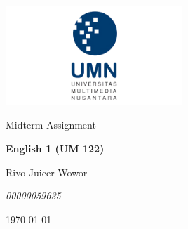 \documentclass[
  12pt,
  answers  
]{exam}
\newcommand{\mytitle}{English 1 (UM 122)}
\newcommand{\theauthor}{Rivo Juicer Wowor}
\newcommand{\affiliation}{00000059635}
\begin{document}
	\begin{titlepage}
		\centering
		\vspace{2cm}
		\includegraphics[width=0.5\textwidth]{../../ref/logoUMN.png}\par\vspace{1cm}
		\vspace{1.5cm}
		\large{Midterm Assignment} \par
		\vspace{1cm}
		\LARGE{\textbf{\mytitle}} \par
		\vspace{1.5cm}
		\large{\theauthor} \par
		\small{\emph{\affiliation}} \par
		\vfill
		\today
		\end{titlepage}	
\end{document}

